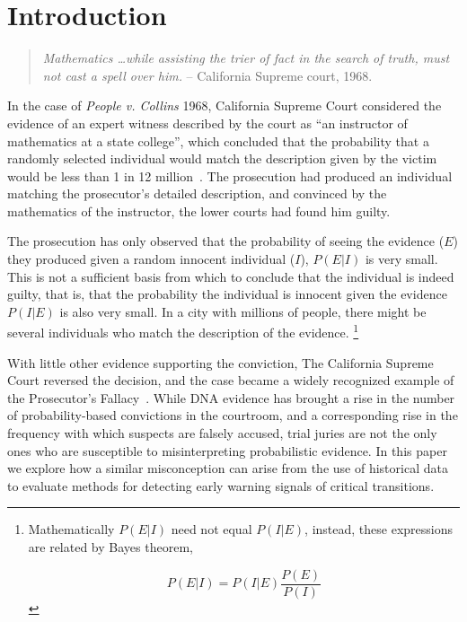 \documentclass[authoryear,review,12pt]{elsarticle}
\begin{document}
\section{Introduction}

\begin{quotation}
\noindent \emph{Mathematics \dots while assisting the trier of fact in the search of truth, must not cast a spell over him.}
-- California Supreme court, 1968.
\end{quotation}

\noindent In the case of \emph{People v. Collins} 1968, California Supreme
Court considered the evidence of an expert witness described by the
court as ``an instructor of mathematics at a state college'', which
concluded that the probability that a randomly selected individual
would match the description given by the victim would be less than 1 in
12 million~\citep{PeopleCollins1968}.  The prosecution had produced an
individual matching the prosecutor's detailed description, and convinced
by the mathematics of the instructor, the lower courts had found him
guilty.


The prosecution has only observed that the probability of seeing the
evidence ($E$) they produced given a random innocent individual ($I$),
$P(E|I)$ is very small.  This is not a sufficient basis from which
to conclude that the individual is indeed guilty, that is, that the
probability the individual is innocent given the evidence $P(I|E)$
is also very small. In a city with millions of people, there might
be several individuals who match the description of the evidence.
\footnote{Mathematically $P(E|I)$ need not equal $P(I|E)$, instead,
these expressions are related by Bayes theorem,

\begin{equation}
  P(E|I) = P(I|E) \frac{P(E)}{P(I)}
\end{equation} }

With little other evidence supporting the conviction, The California
Supreme Court reversed the decision, and the case became a widely
recognized example of the Prosecutor's Fallacy~\citep{Thompson1987}.
While DNA evidence has brought a rise in the number of probability-based
convictions in the courtroom, and a corresponding rise in the frequency
with which suspects are falsely accused, trial juries are not the
only ones who are susceptible to misinterpreting probabilistic evidence.
In this paper we explore how a similar misconception can arise from the
use of historical data to evaluate methods for detecting early warning
signals of critical transitions.
\end{document}
